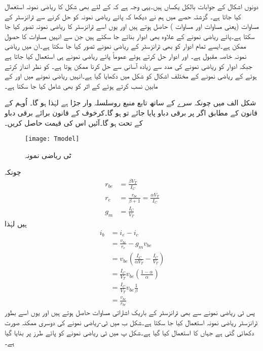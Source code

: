 دونوں اشکال کے جوابات بالکل یکساں ہیں۔یہی وجہ ہے کہ  کے لئے بھی شکل  کا ریاضی نمونہ  استعمال کیا جاتا ہے۔
 
گزشتہ حصے میں ہم نے دیکھا کہ پائے ریاضی نمونہ  کو حل کرنے سے ٹرانزسٹر کے مساوات (یعنی مساوات   اور مساوات  ) حاصل ہوتے ہیں اور یوں اسے ٹرانزسٹر کا ریاضی نمونہ  تصور کیا جا سکتا ہے۔پائے ریاضی نمونے  کے علاوہ بھی ادوار بنائے جا سکتے ہیں جن سے انہیں مساوات کا حصول ممکن ہے۔ایسے تمام ادوار کو بھی ٹرانزسٹر کے ریاضی نمونے  تصور کیا جا سکتا ہے۔ان میں  ریاضی نمونہ  خاصہ مقبول ہے۔ اور   ادوار حل کرتے ہوئے عموماً پائے ریاضی نمونے  ہی استعمال کیا جاتا ہے جبکہ  ادوار کو  ریاضی نمونے  کی مدد سے زیادہ آسانی سے حل کرنا ممکن ہوتا ہے۔ کو نظر انداز کرتے ہوئے   کے  ریاضی نمونے  کے مختلف اشکال کو شکل  میں دکھایا گیا ہے۔انہیں ریاضی نمونے  میں  اور  کے مابین  نسب کرتے ہوئے  کے اثر کو بھی شامل کیا جا سکتا ہے۔

شکل  الف میں چونکہ  سرے کے ساتھ تابع منبع روسلسلہ وار جڑا ہے لہٰذا   ہو گا۔ اُوہم کے قانون کے مطابق اگر   پر  برقی دباو پایا جائے تو   ہو گا۔کرخوف کے قانون برائے برقی دباو کے تحت  ہو گا۔آئیں اس کی قیمت حاصل کریں۔
\begin{figure}
\centering
\texttt{[image: Tmodel]}
\caption{ٹی ریاضی نمونہ }
\label{شکل_ٹی_ماڈل}
\end{figure}
	چونکہ
\begin{align*}
r_{be}&=\frac{\beta V_T}{I_C}\\
r_e &=\frac{r_{be}}{\beta+1}=\frac{\alpha V_T}{I_C}\\
g_m &=\frac{I_C}{V_T}
\end{align*}
ہیں لہٰذا
\begin{align*}
i_b&=i_e-i_c\\
&=\frac{v_{be}}{r_e}-g_m v_{be}\\
&=v_{be} \left (\frac{I_C}{\alpha V_T} - \frac{I_C}{V_T} \right )\\
&=\frac{I_C}{V_T} v_{be} \left(\frac{1-\alpha}{\alpha} \right )\\
&=\frac{I_C}{V_T} v_{be} \frac{1}{\beta}\\
&=\frac{v_{be}}{r_{be}}
\end{align*}
پس ٹی   ریاضی نمونے  سے بھی ٹرانزسٹر کے باریک اشاراتی مساوات حاصل ہوتے ہیں اور یوں اسے بطور ٹرانزسٹر ریاضی نمونہ  استعمال کیا جا سکتا ہے۔شکل  ب میں ٹی-ریاضی نمونے  کی دوسری ممکنہ صورت دکھائی گئی ہے جہاں  کا استعمال کیا گیا ہے۔شکل  پ میں ٹی ریاضی نمونے  کو پائے  طرز پر بنایا گیا ہے۔

